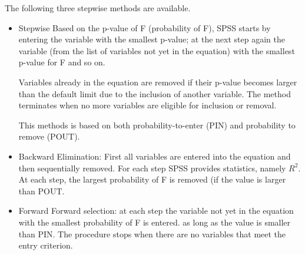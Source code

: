 \documentclass[a4paper,12pt]{article}
\begin{document}
The following three stepwise methods are available.

\begin{itemize}
\item Stepwise Based on the p-value of F (probability of F), SPSS starts by entering the variable with the smallest p-value; at the next step again the variable (from the list of variables not yet in the equation) with the smallest p-value for F and so on. 
    
    Variables already in the equation are removed if their p-value becomes larger than the default limit due to the inclusion of another variable. The method terminates when no more variables are eligible for inclusion or removal.	
    
    This methods is based on both probability-to-enter (PIN) and probability to remove (POUT).
\item Backward Elimination: First all variables are entered into the equation and then sequentially removed. For each step SPSS provides statistics, namely $R^2$. At each step, the largest probability of F is removed (if the value is larger than POUT.
\item Forward Forward selection: at each step the variable not yet in the equation with the smallest probability of F is entered. as long as the value is smaller than PIN. The procedure stops when there are no variables that meet the entry criterion.
\end{itemize}
\newpage
\end{document}

